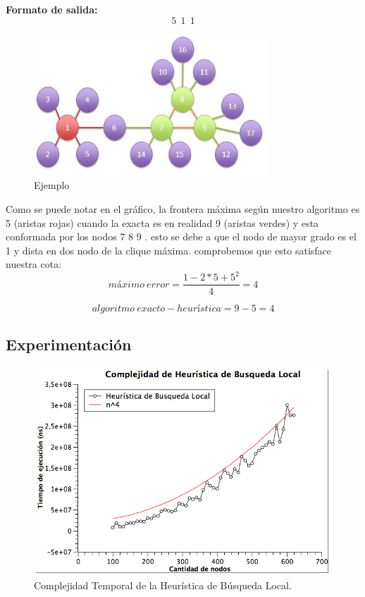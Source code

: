 \begin {itemize}
\textbf{Formato de salida:}
$$5\ \   1\ \   1$$
\begin{figure}[H] %
\begin{center}
\includegraphics[width=250pt]{../imgs/ej2local.jpg}
\caption{Ejemplo}
\end{center}
\end{figure}
Como se puede notar en el gráfico, la frontera máxima según nuestro algoritmo es 5 (aristas rojas) cuando la exacta es en realidad 9 (aristas verdes) y esta conformada por los nodos 7 8 9 . esto se debe a que el nodo de mayor grado es el 1 y dista en dos nodo de la clique máxima.
\newline
comprobemos que esto satisface nuestra cota:
\begin{equation}
  máximo\ error = \frac{1 - 2 * 5 + 5^{2}}{4} = 4
\end{equation}

\begin{equation}
  algoritmo\ exacto - heurística = 9 - 5 = 4
\end{equation}
\end{itemize}

\subsection{Experimentación}

\begin{figure}[H] %
\begin{center}
\includegraphics[width=350pt]{../imgs/complejidad_local.png}
\caption{Complejidad Temporal de la Heurística de Búsqueda Local.}
\end{center}
\end{figure}
